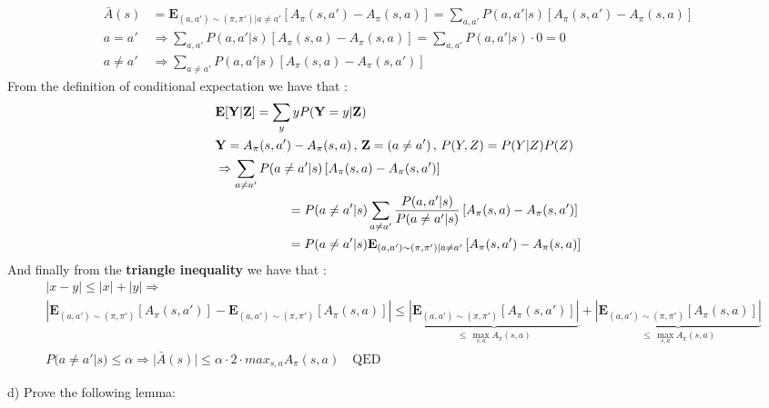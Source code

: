 {{\begin{align}
    \bar{A}(s)& = \mathbf{E}_{(a,a') \sim (\pi , \pi') |a \neq a'} \left[ A_\pi(s,a') - A_\pi(s,a)\right] = \sum_{a,a'}P(a,a'|s)\left[A_\pi(s,a') - A_\pi(s,a)\right] \nonumber \\
    a = a' &\Rightarrow \sum_{a,a'}P(a,a'|s)[A_\pi(s,a) - A_\pi(s,a)] = \sum_{a,a'}P(a,a'|s) \cdot 0 = 0 \nonumber \\
    a \neq a' &\Rightarrow \sum_{a \neq a'}P(a, a'|s)\left[A_\pi(s,a) - A_\pi(s,a')\right] \nonumber 
\end{align}
From the definition of conditional expectation we have that :
\begin{align}
    &\mathbf{E}[\textbf{Y}|\textbf{Z}] = \sum_y yP(\textbf{Y} = y |\textbf{Z}) \nonumber \\
    &\textbf{Y} = A_\pi(s,a') - A_\pi(s,a) \, ,\, \textbf{Z} =(a \neq a')  \, ,\, P(Y,Z) = P(Y|Z)P(Z)\nonumber \\
    &\Rightarrow \sum_{a \neq a'}P(a\neq a'|s)\left[A_\pi(s,a) - A_\pi(s,a')\right] \nonumber \\
    & \hspace{20mm}= P(a\neq a'|s) \sum_{a \neq a'}\frac{P(a,a'|s)}{P(a\neq a'|s)}\left[A_\pi(s,a) - A_\pi(s,a')\right] \nonumber \\
    & \hspace{20mm}= P(a\neq a'|s)\mathbf{E}_{(a , a') \sim (\pi , \pi') | a \neq a'} \left[A_\pi(s,a') - A_\pi(s,a)\right] \nonumber 
\end{align}
And finally from the \textbf{triangle inequality} we have that :
\begin{align}
    &|x - y| \leq |x| + |y| \Rightarrow \nonumber \\
    &|\mathbf{E}_{(a,a') \sim (\pi,\pi')} \left[ A_\pi(s,a')\right] - \mathbf{E}_{(a,a')\sim(\pi,\pi')}\left[A_\pi(s,a)\right]| \leq \underbrace{|\mathbf{E}_{(a,a') \sim (\pi,\pi')} \left[ A_\pi(s,a')\right] |}_{\leq \,\max_{s,a} A_\pi(s,a)} + \underbrace{|\mathbf{E}_{(a,a')\sim(\pi,\pi')}\left[A_\pi(s,a)\right]|}_{\leq \,\max_{s,a} A_\pi(s,a)} \nonumber \\
    &P(a\neq a'|s) \leq \alpha \Rightarrow |\bar A(s)| \leq \alpha \cdot 2\cdot max_{s,a} A_\pi(s,a) \quad \text{QED} \nonumber 
\end{align}
}}

d) Prove the following lemma:

